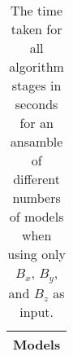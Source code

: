 \begin{table}[!ht]
	\centering
	\begin{tabular}{|c|}
		\hline
		Models \\ \hline
	\end{tabular}
	\caption{The time taken for all algorithm stages in seconds for an ansamble of different numbers of models when using only $B_{x}$, $B_{y}$, and $B_{z}$ as input.}
	\label{tab:time:ansamble:reverse:coord}
\end{table}
